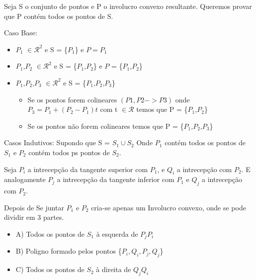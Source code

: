 \documentclass[11pt]{article}
\begin{document}
Seja S o conjunto de pontos e P o involucro convexo resultante.
Queremos provar que P contém todos os pontos de S.

Caso Base:
\begin{itemize}
    \item $P_1$ $\in \mathcal{R}^2$ e S = \{$P_1$\} e $P = P_1$
    \item $P_1$,$P_2$ $\in \mathcal{R}^2$ e S = \{$P_1$,$P_2$\} e $P$ = \{$P_1$,$P_2$\}
    \item $P_1$,$P_2$,$P_3$ $\in \mathcal{R}^2$ e S = \{$P_1$,$P_2$,$P_3$\} 
        \newline
        \begin{itemize}
            \item Se os pontos forem colineares $(P1,P2 -> P3)$ 
                \newline
                onde $P_3 = P_1 + (P_2 - P_1)t$ com t $\in \mathcal{R}$
                \newline
                 temos que P = \{$P_1$,$P_2$\}

            \item Se os pontos não forem colineares  
                \newline
                 temos que P = \{$P_1$,$P_2$,$P_3$\}
        \end{itemize}
\end{itemize}

Casos Indutivos:
\newline
Supondo que S = $S_1 \cup S_2$ 
\newline
Onde $P_1$ contém todos os pontos de $S_1$ e $P_2$ contém todos ps pontos
de $S_2$.
\newline

Seja $P_i$ a intrecepção da tangente superior com $P_1$, e $Q_i$ a intrecepção 
com $P_2$.
E analogamente $P_j$ a intrecepção da tangente inferior com $P_1$
e $Q_j$ a intrecepção com $P_2$.

Depois de Se juntar $P_1$ e $P_2$ cria-se apenas um Involucro convexo,
onde se pode dividir em 3 partes.

\begin{itemize}
    \item A) Todos os pontos de $S_1$ à esquerda de $P_jP_i$
    \item B) Poligno formado pelos pontos \{$P_i,Q_i,P_j,Q_j$\}
    \item C) Todos os pontos de $S_2$ à direita de $Q_jQ_i$
\end{itemize}
\end{document}
